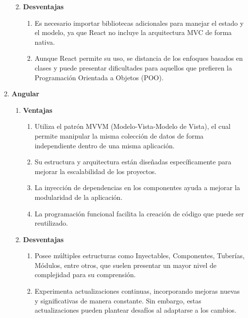 \begin{enumerate}
\begin{enumerate}
\begin{enumerate}
                    \end{enumerate}
              \item \textbf{Desventajas}
                    \begin{enumerate}
                        \item Es necesario importar bibliotecas adicionales para manejar el estado y el modelo, ya que React no incluye la arquitectura MVC de forma nativa.
                        \item Aunque React permite su uso, se distancia de los enfoques basados en clases y puede presentar dificultades para aquellos que prefieren la Programación Orientada a Objetos (POO).
                    \end{enumerate}
          \end{enumerate}
    \item \textbf{Angular}
          \begin{enumerate}
              \item \textbf{Ventajas}
                    \begin{enumerate}
                        \item Utiliza el patrón MVVM (Modelo-Vista-Modelo de Vista), el cual permite manipular la misma colección de datos de forma independiente dentro de una misma aplicación.
                        \item Su estructura y arquitectura están diseñadas específicamente para mejorar la escalabilidad de los proyectos.
                        \item La inyección de dependencias en los componentes ayuda a mejorar la modularidad de la aplicación.
                        \item La programación funcional facilita la creación de código que puede ser reutilizado.
                    \end{enumerate}
              \item \textbf{Desventajas}
                    \begin{enumerate}
                        \item Posee múltiples estructuras como Inyectables, Componentes, Tuberías, Módulos, entre otros, que suelen presentar un mayor nivel de complejidad para su comprensión.
                        \item Experimenta actualizaciones continuas, incorporando mejoras nuevas y significativas de manera constante. Sin embargo, estas actualizaciones pueden plantear desafíos al adaptarse a los cambios.
                    \end{enumerate}

\end{enumerate}
\end{enumerate}
